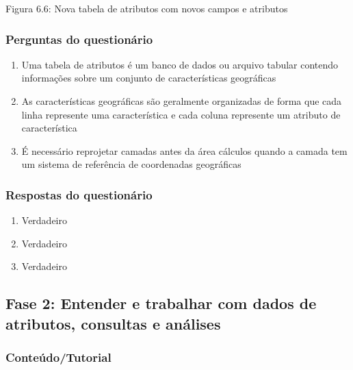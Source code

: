\documentclass[
]{book}
\providecommand{\tightlist}{%
  \setlength{\itemsep}{0pt}\setlength{\parskip}{0pt}}
\begin{document}
Figura 6.6: Nova tabela de atributos com novos campos e atributos

\hypertarget{perguntas-do-questionuxe1rio-14}{%
\subsubsection{\texorpdfstring{\textbf{Perguntas do questionário}}{Perguntas do questionário}}\label{perguntas-do-questionuxe1rio-14}}

\begin{enumerate}
\def\labelenumi{\arabic{enumi}.}
\item
  Uma tabela de atributos é um banco de dados ou arquivo tabular contendo informações sobre um conjunto de características geográficas
\item
  As características geográficas são geralmente organizadas de forma que cada linha represente uma característica e cada coluna represente um atributo de característica
\item
  É necessário reprojetar camadas antes da área cálculos quando a camada tem um sistema de referência de coordenadas geográficas
\end{enumerate}

\hypertarget{respostas-do-questionuxe1rio-5}{%
\subsubsection{\texorpdfstring{\textbf{Respostas do questionário}}{Respostas do questionário}}\label{respostas-do-questionuxe1rio-5}}

\begin{enumerate}
\def\labelenumi{\arabic{enumi}.}
\tightlist
\item
  Verdadeiro
\item
  Verdadeiro
\item
  Verdadeiro
\end{enumerate}

\hypertarget{fase-2-entender-e-trabalhar-com-dados-de-atributos-consultas-e-anuxe1lises}{%
\subsection{Fase 2: Entender e trabalhar com dados de atributos, consultas e análises}\label{fase-2-entender-e-trabalhar-com-dados-de-atributos-consultas-e-anuxe1lises}}

\hypertarget{conteuxfadotutorial-3}{%
\subsubsection{\texorpdfstring{\textbf{Conteúdo/Tutorial}}{Conteúdo/Tutorial}}\label{conteuxfadotutorial-3}}
\end{document}
